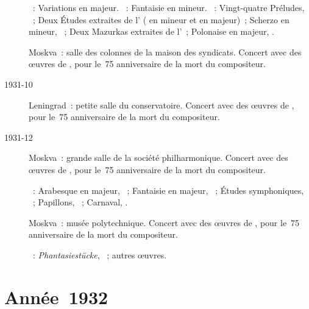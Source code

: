 \begin{description}
 \textsc{\Haendel{}}~: Variations en \kE majeur.
 \textsc{\Mozart{}}~: Fantaisie en \kC mineur.
 \textsc{\Chopin{}}~: Vingt-quatre Préludes, ~; Deux Études
 extraites de l' ( en \kE \Flat mineur et  en
 \kG \Flat majeur)~; Scherzo  en \kC \Sharp mineur, ~;
 Deux Mazurkas extraites de l'~; Polonaise en \kA \Flat majeur,
 .
 \item[\DateWithWeekDay{1931-10-11}]
 Moskva~: salle des colonnes de la maison des syndicats.
 Concert avec des œuvres de \Schumann{}, pour le~75\ieme{} anniversaire de
 la mort du compositeur.
 \item[1931-10]
 Leningrad~: petite salle du conservatoire.
 Concert avec des œuvres de \Schumann{}, pour le~75\ieme{} anniversaire de
 la mort du compositeur.
 \item[1931-12]
 Moskva~: grande salle de la société philharmonique.
 Concert avec des œuvres de \Schumann{}, pour le~75\ieme{} anniversaire de
 la mort du compositeur.

 \textsc{\Schumann{}}~: Arabesque en \kC majeur, ~; Fantaisie en
 \kC majeur, ~; Études symphoniques, ~; Papillons,
 ~; Carnaval, .
 \item[\DateWithWeekDay{1931-12-25}]
 Moskva~: musée polytechnique.
 Concert avec des œuvres de \Schumann{}, pour le~75\ieme{} anniversaire de
 la mort du compositeur.

 \textsc{\Schumann{}}~: \emph{Phantasiestücke}, ~; autres œuvres.
\end{description}

\section{Année~1932}

